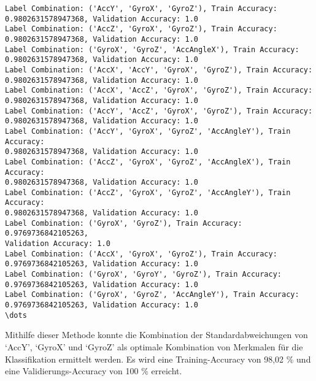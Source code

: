 \documentclass[11pt]{article}
\begin{document}
    \begin{Verbatim}[commandchars=\\\{\}]
Label Combination: ('AccY', 'GyroX', 'GyroZ'), Train Accuracy:
0.9802631578947368, Validation Accuracy: 1.0
Label Combination: ('AccZ', 'GyroX', 'GyroZ'), Train Accuracy:
0.9802631578947368, Validation Accuracy: 1.0
Label Combination: ('GyroX', 'GyroZ', 'AccAngleX'), Train Accuracy:
0.9802631578947368, Validation Accuracy: 1.0
Label Combination: ('AccX', 'AccY', 'GyroX', 'GyroZ'), Train Accuracy:
0.9802631578947368, Validation Accuracy: 1.0
Label Combination: ('AccX', 'AccZ', 'GyroX', 'GyroZ'), Train Accuracy:
0.9802631578947368, Validation Accuracy: 1.0
Label Combination: ('AccY', 'AccZ', 'GyroX', 'GyroZ'), Train Accuracy:
0.9802631578947368, Validation Accuracy: 1.0
Label Combination: ('AccY', 'GyroX', 'GyroZ', 'AccAngleY'), Train Accuracy:
0.9802631578947368, Validation Accuracy: 1.0
Label Combination: ('AccZ', 'GyroX', 'GyroZ', 'AccAngleX'), Train Accuracy:
0.9802631578947368, Validation Accuracy: 1.0
Label Combination: ('AccZ', 'GyroX', 'GyroZ', 'AccAngleY'), Train Accuracy:
0.9802631578947368, Validation Accuracy: 1.0
Label Combination: ('GyroX', 'GyroZ'), Train Accuracy: 0.9769736842105263,
Validation Accuracy: 1.0
Label Combination: ('AccX', 'GyroX', 'GyroZ'), Train Accuracy:
0.9769736842105263, Validation Accuracy: 1.0
Label Combination: ('GyroX', 'GyroY', 'GyroZ'), Train Accuracy:
0.9769736842105263, Validation Accuracy: 1.0
Label Combination: ('GyroX', 'GyroZ', 'AccAngleY'), Train Accuracy:
0.9769736842105263, Validation Accuracy: 1.0
\dots
    \end{Verbatim}

    Mithilfe dieser Methode konnte die Kombination der Standardabweichungen
von `AccY', `GyroX' und `GyroZ' als optimale Kombination von Merkmalen
für die Klassifikation ermittelt werden. Es wird eine Training-Accuracy
von 98,02 \% und eine Validierungs-Accuracy von 100 \% erreicht.
\end{document}
